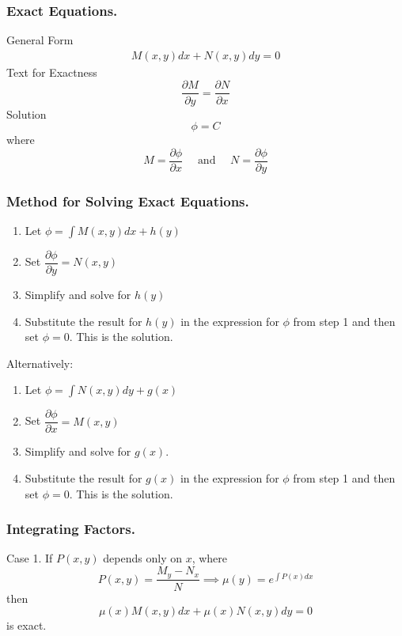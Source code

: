 \documentclass[../../main.tex]{subfiles}
\begin{document}
\subsubsection{Exact Equations.} General Form
\begin{align*}
M(x,y)dx + N(x,y)dy = 0 
\end{align*}
Text for Exactness
\begin{equation*}
\dfrac{\partial M}{\partial y}=\dfrac{\partial N}{\partial x}
\end{equation*}
Solution
\begin{equation*}
\phi=C
\end{equation*}
where
\begin{equation*}
M=\dfrac{\partial \phi}{\partial x}\quad\text{ and }\quad N=\dfrac{\partial \phi}{\partial y}
\end{equation*}

\subsubsection{Method for Solving Exact Equations. }

\begin{enumerate}
\item Let $\phi=\int M(x,y)dx + h(y)$
\item Set $\dfrac{\partial \phi}{\partial y} = N(x,y)$
\item Simplify and solve for $h(y)$
\item  Substitute the result for $h(y)$ in the expression for $\phi$ from step 1 and then set $\phi=0$. This is the solution. 
\end{enumerate}

Alternatively: 
\begin{enumerate}
\item Let $\phi=\int N(x,y)dy + g(x)$
\item Set $\dfrac{\partial \phi}{\partial x} = M(x,y)$
\item Simplify and solve for $g(x)$. 
\item Substitute the result for $g(x)$ in the expression for $\phi$ from step 1 and then set $\phi=0$. This is the solution. 
\end{enumerate}

\subsubsection{Integrating Factors.} Case 1. If $P(x,y)$ depends only on $x$, where
\begin{equation*}
P(x,y)=\dfrac{M_y-N_x}{N} \implies \mu(y) = e^{\int P(x)dx}
\end{equation*}
then
\begin{equation*}
\mu(x) M(x,y) dx + \mu(x) N(x,y) dy = 0
\end{equation*}
is exact.
\end{document}
